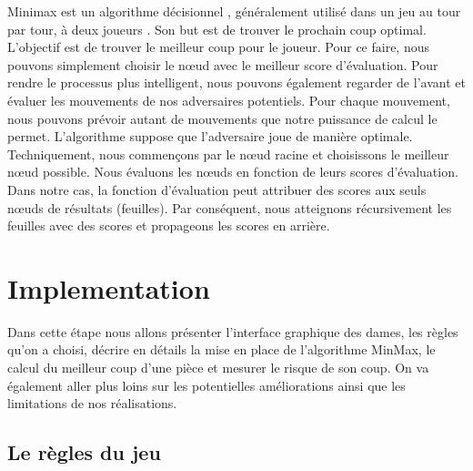 \documentclass[11pt]{article} %
\begin{document}
Minimax est un algorithme décisionnel , généralement utilisé dans un jeu au tour par tour, à deux joueurs . Son but est de trouver le prochain coup optimal.
L'objectif est de trouver le meilleur coup pour le joueur. Pour ce faire, nous pouvons simplement choisir le nœud avec le meilleur score d’évaluation. Pour rendre le processus plus intelligent, nous pouvons également regarder de l’avant et évaluer les mouvements de nos adversaires potentiels.
Pour chaque mouvement, nous pouvons prévoir autant de mouvements que notre puissance de calcul le permet. L’algorithme suppose que l’adversaire joue de manière optimale.
Techniquement, nous commençons par le nœud racine et choisissons le meilleur nœud possible. Nous évaluons les nœuds en fonction de leurs scores d’évaluation. Dans notre cas, la fonction d’évaluation peut attribuer des scores aux seuls nœuds de résultats (feuilles).
Par conséquent, nous atteignons récursivement les feuilles avec des scores et propageons les scores en arrière. \cite{Minimax}


\section{Implementation}
Dans cette étape nous allons présenter l’interface graphique des dames, les règles qu’on a choisi, décrire en détails la mise en place de l’algorithme MinMax, le calcul du meilleur coup  d’une pièce et mesurer le risque de son coup. On va également aller plus loins sur les potentielles améliorations ainsi que les limitations de nos réalisations.



\subsection{Le règles du jeu}
\end{document}
